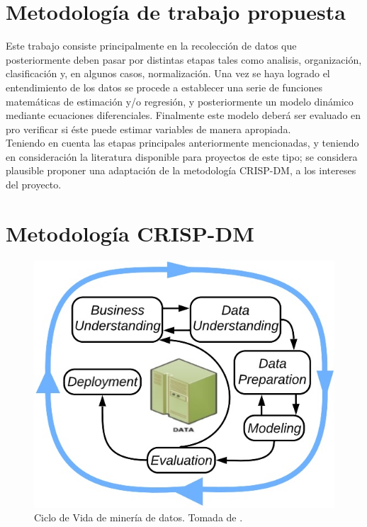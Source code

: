 \section{Metodología de trabajo propuesta}
Este trabajo consiste principalmente en la recolección de datos que posteriormente deben pasar por distintas etapas tales como analisis, organización, clasificación y, en algunos casos, normalización. Una vez se haya logrado el entendimiento de los datos se procede a establecer una serie de funciones matemáticas de estimación y/o regresión, y posteriormente un modelo dinámico mediante ecuaciones diferenciales. Finalmente este modelo deberá ser evaluado en pro verificar si éste puede estimar variables de manera apropiada.\\

Teniendo en cuenta las etapas principales anteriormente mencionadas, y teniendo en consideración la literatura disponible para proyectos de este tipo; se considera plausible proponer una adaptación de la metodología CRISP-DM, a los intereses del proyecto. 


\section{Metodología CRISP-DM}

\begin{figure}[H]
    \centering
    \includegraphics[scale=0.50]{img/ciclocrisp.jpg}
    \caption{Ciclo de Vida de minería de datos. Tomada de \cite{ibmcrisp}.}
    \label{ciclocrisp}
\end{figure}


